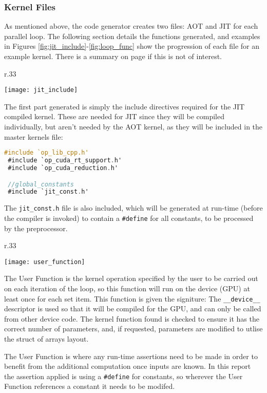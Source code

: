 \subsubsection{Kernel Files}
\label{ss:krnl_files}
As mentioned above, the code generator creates two files: AOT and JIT for each parallel loop. The following section details the functions generated, and examples in Figures \ref{fig:jit_include}-\ref{fig:loop_func} show the progression of each file for an example kernel. There is a summary on page \pageref{impl_summary} if this is not of interest.

%
\begin{wrapfigure}[10]{r}{.33\textwidth}
  \vspace{-2em}
  \centering
  \caption{JIT includes}
  \label{fig:jit_include}
  \texttt{[image: jit\_include]}
\end{wrapfigure}
The first part generated is simply the include directives required for the JIT compiled kernel. These are needed for JIT since they will be compiled individually, but aren't needed by the AOT kernel, as they will be included in the master kernels file:
\begin{lstlisting}[backgroundcolor = \color{green!20}, language=C]
 #include `op_lib_cpp.h'
 #include `op_cuda_rt_support.h'
 #include `op_cuda_reduction.h'

 //global_constants
 #include `jit_const.h'
\end{lstlisting}
The \verb|jit_const.h| file is also included, which will be generated at run-time (before the compiler is invoked) to contain a \verb|#define| for all constants, to be processed by the preprocessor.

\begin{wrapfigure}[12]{r}{.33\textwidth}
  \vspace{-2em}
  \centering
  \caption{User Function}
  \label{fig:usr_func}
  \texttt{[image: user\_function]}
\end{wrapfigure}
The User Function is the kernel operation specified by the user to be carried out on each iteration of the loop, so this function will run on the device (GPU) at least once for each set item. This function is given the signiture:
The \verb|__device__| descriptor is used so that it will be compiled for the GPU, and can only be called from other device code.
The kernel function found is checked to ensure it has the correct number of parameters, and, if requested, parameters are modified to utlise the struct of arrays layout.
\par
The User Function is where any run-time assertions need to be made in order to benefit from the additional computation once inputs are known. In this report the assertion applied is using a \verb|#define| for constants, so wherever the User Function references a constant it needs to be modifed.


